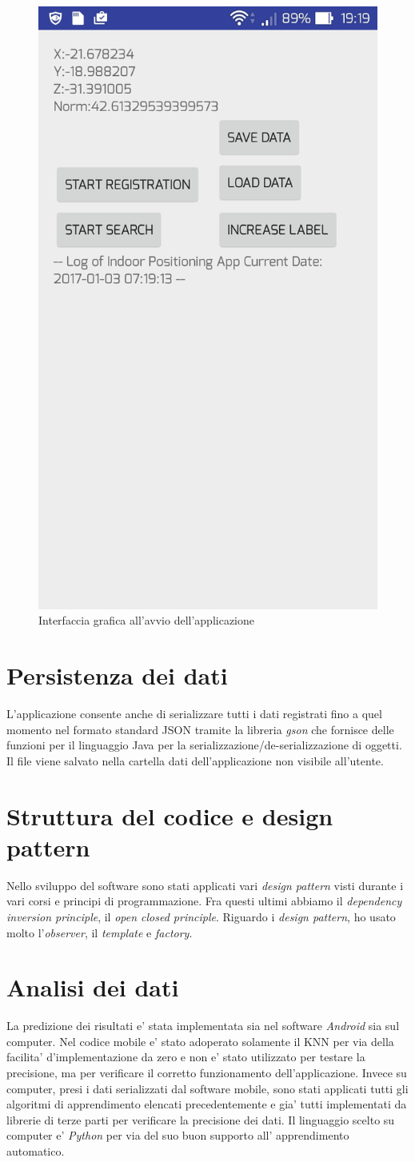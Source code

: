 \begin{figure}[H]
\centering
\includegraphics[width=0.3\linewidth]{img/app_screen}
\caption{Interfaccia grafica all'avvio dell'applicazione}
\label{fig:app_screen}
\end{figure}

\section*{Persistenza dei dati}
L'applicazione consente anche di serializzare tutti i dati registrati fino a quel momento nel formato standard JSON tramite la libreria \textit{gson} che fornisce delle funzioni  per il linguaggio Java per la serializzazione/de-serializzazione di oggetti. Il file viene salvato nella cartella dati dell'applicazione non visibile all'utente.

\section*{Struttura del codice e design pattern}
Nello sviluppo del software sono stati applicati vari \textit{design pattern} visti durante i vari corsi e principi di programmazione. Fra questi ultimi abbiamo il \textit{dependency inversion principle}, il \textit{open closed principle}. Riguardo i \textit{design pattern}, ho usato molto l'\textit{observer}, il \textit{template} e \textit{factory}.

\section*{Analisi dei dati}
La predizione dei risultati e' stata implementata sia nel software \textit{Android} sia sul computer. Nel codice mobile e' stato adoperato solamente il KNN per via della facilita' d'implementazione da zero e non e' stato  utilizzato per testare la precisione, ma per verificare il corretto funzionamento dell'applicazione. Invece su computer, presi i dati serializzati dal software mobile, sono stati applicati tutti gli algoritmi di apprendimento elencati precedentemente e gia' tutti implementati da librerie di terze parti per verificare la precisione dei dati. Il linguaggio scelto su computer e' \textit{Python} per via del suo buon supporto all' apprendimento automatico.